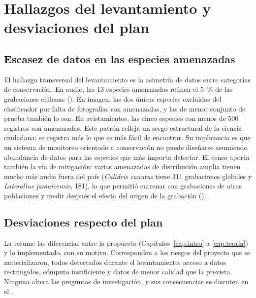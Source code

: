 \section{Hallazgos del levantamiento y desviaciones del plan}\label{sec:hallazgos}

\subsection{Escasez de datos en las especies amenazadas}

El hallazgo transversal del levantamiento es la asimetría de datos entre
categorías de conservación. En audio, las 13 especies amenazadas reúnen el
\SI{5}{\percent} de las grabaciones chilenas (). En
imagen, las dos únicas especies excluidas del clasificador por falta de
fotografías son amenazadas, y las de menor conjunto de prueba también lo
son. En avistamientos, las cinco especies con menos de 500 registros son
amenazadas. Este patrón refleja un sesgo estructural de la ciencia
ciudadana: se registra más lo que es más fácil de encontrar. Su implicancia
es que un sistema de monitoreo orientado a conservación no puede diseñarse
asumiendo abundancia de datos para las especies que más importa detectar. El
censo aporta también la vía de mitigación: varias amenazadas de distribución
amplia tienen mucho más audio fuera del país (\textit{Calidris canutus} tiene
311 grabaciones globales y \textit{Laterallus jamaicensis}, 181), lo que permitió
entrenar con grabaciones de otras poblaciones y medir después el efecto del
origen de la grabación ().

\subsection{Desviaciones respecto del plan}

La  resume las diferencias entre la propuesta
(Capítulos~\ref{cap:intro} a \ref{cap:teoria}) y lo implementado, con su
motivo. Corresponden a los riesgos del proyecto que se materializaron, todos
detectados durante el levantamiento: acceso a datos restringidos, cómputo
insuficiente y datos de menor calidad que la prevista. Ninguna altera las
preguntas de investigación, y sus consecuencias se discuten en el
.

